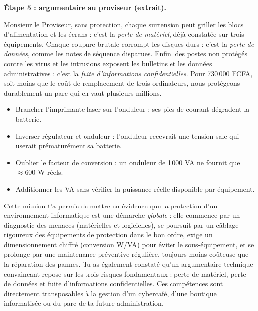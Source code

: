 \documentclass[11pt]{article}
\newcounter{popsec}
\newcounter{popsub}
\newcommand{\courssub}[1]{%
  \stepcounter{popsub}%
  \par\vspace{9pt}\noindent{\popxbold\fontsize{11.5}{13}\selectfont\color{popink}{\color{poporange}\thepopsec.\thepopsub}\hspace{6pt}#1}\par\nopagebreak\vspace{4pt}
}
\begin{document}
\begin{exoresolu}
\textbf{Étape 5 : argumentaire au proviseur (extrait).}

\og Monsieur le Proviseur, sans protection, chaque surtension peut griller les blocs d'alimentation et les écrans : c'est la \emph{perte de matériel}, déjà constatée sur trois équipements. Chaque coupure brutale corrompt les disques durs : c'est la \emph{perte de données}, comme les notes de séquence disparues. Enfin, des postes non protégés contre les virus et les intrusions exposent les bulletins et les données administratives : c'est la \emph{fuite d'informations confidentielles}. Pour 730\,000 FCFA, soit moins que le coût de remplacement de trois ordinateurs, nous protégeons durablement un parc qui en vaut plusieurs millions. \fg
\end{exoresolu}

\begin{attention}
\begin{itemize}
\item Brancher l'imprimante laser sur l'onduleur : ses pics de courant dégradent la batterie.
\item Inverser régulateur et onduleur : l'onduleur recevrait une tension sale qui userait prématurément sa batterie.
\item Oublier le facteur de conversion : un onduleur de 1\,000 VA ne fournit que $\approx 600$ W réels.
\item Additionner les VA sans vérifier la puissance réelle disponible par équipement.
\end{itemize}
\end{attention}

\courssub{Bilan de l'activité}

Cette mission t'a permis de mettre en évidence que la protection d'un environnement informatique est une démarche \emph{globale} : elle commence par un diagnostic des menaces (matérielles et logicielles), se poursuit par un câblage rigoureux des équipements de protection dans le bon ordre, exige un dimensionnement chiffré (conversion W/VA) pour éviter le sous-équipement, et se prolonge par une maintenance préventive régulière, toujours moins coûteuse que la réparation des pannes. Tu as également constaté qu'un argumentaire technique convaincant repose sur les trois risques fondamentaux : perte de matériel, perte de données et fuite d'informations confidentielles. Ces compétences sont directement transposables à la gestion d'un cybercafé, d'une boutique informatisée ou du parc de ta future administration.
\end{document}
